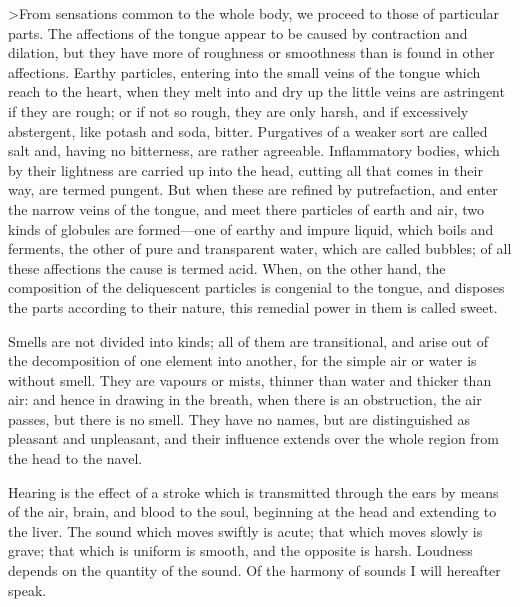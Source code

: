 >From sensations common to the whole body, we proceed to those of
particular parts. The affections of the tongue appear to be caused by
contraction and dilation, but they have more of roughness or smoothness
than is found in other affections. Earthy particles, entering into the
small veins of the tongue which reach to the heart, when they melt into
and dry up the little veins are astringent if they are rough; or if not so
rough, they are only harsh, and if excessively abstergent, like potash and
soda, bitter. Purgatives of a weaker sort are called salt and, having no
bitterness, are rather agreeable. Inflammatory bodies, which by their
lightness are carried up into the head, cutting all that comes in their
way, are termed pungent. But when these are refined by putrefaction, and
enter the narrow veins of the tongue, and meet there particles of earth
and air, two kinds of globules are formed—one of earthy and impure
liquid, which boils and ferments, the other of pure and transparent water,
which are called bubbles; of all these affections the cause is termed
acid. When, on the other hand, the composition of the deliquescent
particles is congenial to the tongue, and disposes the parts according to
their nature, this remedial power in them is called sweet.

Smells are not divided into kinds; all of them are transitional, and arise
out of the decomposition of one element into another, for the simple air
or water is without smell. They are vapours or mists, thinner than water
and thicker than air: and hence in drawing in the breath, when there is an
obstruction, the air passes, but there is no smell. They have no names,
but are distinguished as pleasant and unpleasant, and their influence
extends over the whole region from the head to the navel.

Hearing is the effect of a stroke which is transmitted through the ears by
means of the air, brain, and blood to the soul, beginning at the head and
extending to the liver. The sound which moves swiftly is acute; that which
moves slowly is grave; that which is uniform is smooth, and the opposite
is harsh. Loudness depends on the quantity of the sound. Of the harmony of
sounds I will hereafter speak.

